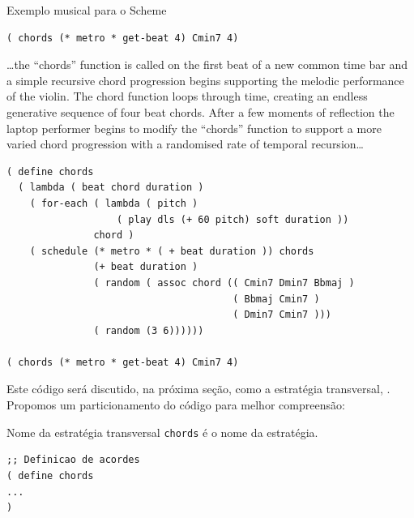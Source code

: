 \begin{example}{Exemplo musical para o Scheme}
\begin{verbatim}
( chords (* metro * get-beat 4) Cmin7 4)
\end{verbatim}

\begin{citacao}
{\ldots the “chords” function is called on the first beat of a new common time bar and a simple recursive chord progression begins supporting the melodic performance of the violin. The chord function loops through time, creating an endless generative sequence of four beat chords. After a few moments of reflection the laptop performer begins to modify the “chords” function to support a more varied chord progression with a randomised rate of temporal recursion\ldots}
\end{citacao}

\begin{verbatim}
( define chords
  ( lambda ( beat chord duration )
    ( for-each ( lambda ( pitch )
                   ( play dls (+ 60 pitch) soft duration ))
               chord )
    ( schedule (* metro * ( + beat duration )) chords
               (+ beat duration )
               ( random ( assoc chord (( Cmin7 Dmin7 Bbmaj )
                                       ( Bbmaj Cmin7 )
                                       ( Dmin7 Cmin7 )))
               ( random (3 6))))))
               
( chords (* metro * get-beat 4) Cmin7 4)
\end{verbatim}
\end{example}

Este código será discutido, na próxima seção, como a estratégia transversal, . Propomos um particionamento do código para melhor compreensão:

\begin{example}{Nome da estratégia transversal}
\verb|chords| é o nome da estratégia.

\begin{verbatim}
;; Definicao de acordes
( define chords
...
)
\end{verbatim}
\end{example}

